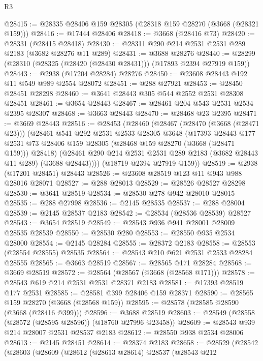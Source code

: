 \begin{lexlean}{R3}
\begin{coremodule}
@28415 := @28335 @28406 @159 @28305 (@28318 @159 @28270 (@3668 (@28321 @159)))
@28416 := @17444 @28406
@28418 := @3668 (@28416 @73)
@28420 := @28331 (@28415 @28418)
@28430 := @28311 @290 @214 @2531 @2531 @289 @2183 (@3682 @28276 @11 @289)
@28431 := @3688 @28276
@28440 := @28299 (@28310 (@28325 (@28420 (@28430 @28431))) (@17893 @2394 @27919 @159))
@28443 := @2938 (@17204 @28284) @28276
@28450 := @23608 @28443 @192 @11 @549 @989 @2554 @28072
@28451 := @288 @27921
@28453 := @28450 @28451 @28298
@28460 := @3641 @28443 @305 @544 @2552 @2531 @28308 @28451
@28461 := @3654 @28443
@28467 := @28461 @204 @543 @2531 @2534 @2395 @28307
@28468 := @3663 @28443
@28470 := @28468 @23 @2395
@28471 := @3669 @28443
@28516 := @28453
    (@28460
      (@28467
        (@28470 (@3668 (@28471 @23)))
        (@28461
          @541
          @292
          @2531
          @2533
          @28305
          @3648
          (@17393
            @28443
            @177
            @2531
            @73
            @28406
            @159
            @28305
            (@28468 @159 @28270 (@3668 (@28471 @159)))
            @28418)
          (@28461 @290 @214 @2531 @2531 @289 @2183 (@3682 @28443 @11 @289) (@3688 @28443))))
      (@18719 @2394 @27919 @159))
@28519 := @2938 (@17201 @28451) @28443
@28526 := @23608 @28519 @123 @11 @943 @988 @28016 @28071
@28527 := @288 @28013
@28529 := @28526 @28527 @28298
@28530 := @3641 @28519
@28534 := @28530 @278 @942 @28010 @28015
@28535 := @288 @27998
@28536 := @2145 @28535
@28537 := @288 @28004
@28539 := @2145 @28537 @2183
@28542 := @28534 (@28536 @28539) @28527
@28543 := @3654 @28519
@28549 := @28543 @936 @941 @28001 @28009 @28535 @28539
@28550 := @28530 @280
@28553 := @28550 @935 @2534 @28000
@28554 := @2145 @28284
@28555 := @28372 @2183
@28558 := @28553 (@28554 @28555) @28535
@28564 := @28543 @210 @621 @2531 @2533 @28284 @28555
@28565 := @3663 @28519
@28567 := @28565 @171 @28284
@28568 := @3669 @28519
@28572 := @28564 (@28567 (@3668 (@28568 @171)))
@28578 := @28543 @619 @214 @2531 @2531 @28371 @2183
@28581 := @17393 @28519 @177 @2531
@28585 := @28581 @399 @28406 @159 @28371
@28590 := @28565 @159 @28270 (@3668 (@28568 @159))
@28595 := @28578 (@28585 @28590 (@3668 (@28416 @399)))
@28596 := @3688 @28519
@28603 := @28549 (@28558 (@28572 (@28595 @28596)) (@18760 @27996 @23458))
@28609 := @28543 @939 @214 @28007 @2531 @28537 @2183
@28612 := @28550 @938 @2534 @28006
@28613 := @2145 @28451
@28614 := @28374 @2183
@28658 := @28529
    (@28542
      (@28603
        (@28609
          (@28612
            (@28613 @28614)
            @28537
            (@28543
              @212

\end{coremodule}
\end{lexlean}
